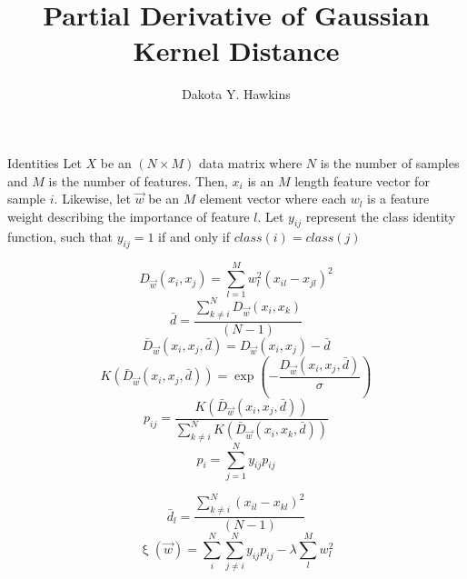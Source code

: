 \documentclass[12pt, a4paper]{article}
\title{Partial Derivative of Gaussian Kernel Distance}
\author{Dakota Y. Hawkins}
\begin{document}
\maketitle


\begin{section}{Identities}
    Let $X$ be an $(N \times M)$ data matrix where $N$ is the number of samples
    and $M$ is the number of features. Then, $x_i$ is an $M$ length feature
    vector for sample $i$. Likewise, let $\vec w$ be an $M$ element vector where
    each $w_l$ is a feature weight describing the importance of feature $l$. Let
    $y_{ij}$ represent the class identity function, such that $y_{ij} = 1$ if
    and only if $class(i) = class(j)$

    \begin{equation} \label{D}
        D_{\vec w}(x_i, x_j) = \sum \limits_{l = 1}^M w_l^2
                               \left ( x_{il} - x_{jl} \right )^2
    \end{equation}
    \begin{equation} \label{d.avg}
        \bar d = \dfrac{\sum \limits_{k \neq i}^N D_{\vec w}(x_i, x_k)}{(N - 1)}
    \end{equation}
    \begin{equation} \label{D.bar}
    \bar D_{\vec w}(x_i, x_j, \bar d) = D_{\vec w}(x_i, x_j) - \bar d
    \end{equation}
    \begin{equation} \label{k.dist}
        K(\bar D_{\vec w}(x_i, x_j, \bar d)) = \exp{\left ( -  \dfrac
                                                  {D_{\vec w}(x_i, x_j, \bar d)}
                                                  {\sigma} \right )}
    \end{equation}
    \begin{equation} \label{pij}
        p_{ij} = \dfrac{K(\bar D_{\vec w}(x_i, x_j, \bar d))}{\sum
                 \limits_{k \neq i}^N K(\bar D_{\vec w}(x_i, x_k, \bar d))}
    \end{equation}
    \begin{equation} \label{pi}
        p_{i} = \sum \limits_{j = 1}^{N} y_{ij} p_{ij}
    \end{equation}

    \begin{equation} \label{d_l}
        \bar d_l = \dfrac{\sum \limits_{k \neq i}^N (x_{il} - x_{kl})^2}
                         {(N - 1)} 
    \end{equation}
    \begin{equation} \label{obj}
        \upxi(\vec w) = \sum \limits_i^N \sum \limits_{j \neq i}^N y_{ij} p_{ij}
                         - \lambda \sum \limits_l^M w_l^2
    \end{equation}


\end{section}
\end{document}
